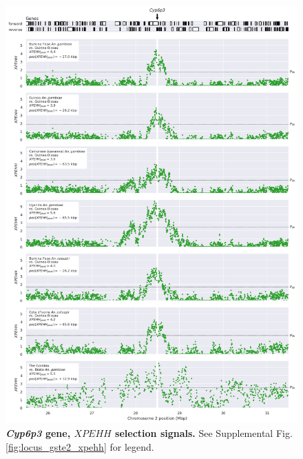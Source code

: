 \documentclass[a4paper,11pt,abstracton,hidelinks]{scrartcl}
\begin{document}
\begin{figure}[t!]
	\begin{center}
		\includegraphics*[width=1\linewidth,center]{artwork/locus_cyp6p3_xpehh_pdist.png}
	\end{center}
	\caption[\textit{Cyp6p3} gene, $XPEHH$ selection signals]{
	\textbf{\textit{Cyp6p3} gene, $XPEHH$ selection signals.}
	See Supplemental Fig. \ref{fig:locus_gste2_xpehh} for legend.
	} 
	\label{fig:locus_cyp6p3_xpehh}
\end{figure}
\end{document}
